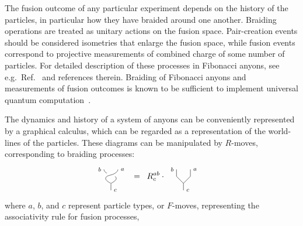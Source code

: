\documentclass[aps, prl, letterpaper, twocolumn, superscriptaddress, notitlepage, 10pt]{revtex4-1}
\begin{document}
The fusion outcome of any particular experiment depends on the history of the particles, in 
particular how they have braided around one another. Braiding operations are treated as 
unitary actions on the fusion space. Pair-creation events should be considered isometries 
that enlarge the fusion space, while fusion events correspond to projective measurements 
of combined charge of some number of particles. For detailed description of these 
processes in Fibonacci anyons, see e.g.~Ref.~\cite{Nayak2008} and references therein. 
Braiding of Fibonacci anyons and measurements of fusion outcomes is known to be 
sufficient to implement universal quantum computation~\cite{Freedman2002, Nayak2008}.

The dynamics and history of a system of anyons can be conveniently represented by a graphical calculus, which can be regarded as a representation of the world-lines of the particles. These diagrams can be manipulated by $R$-moves, corresponding to braiding processes:
	\begin{align}
	\label{e:rmove}
		\begin{tikzpicture}[baseline=0.5cm,scale=0.3]		
			\draw(0,0)--(0,1);
			\draw plot [smooth, tension=1] coordinates { (0,1) (0.75,1.8) (-0.6,2.45) (-1,3)};
			\draw[color=white, line width=7] plot [smooth, tension=1] coordinates { (0,1) (-0.75,1.8) (0.6,2.45) (1,3)};
			\draw plot [smooth, tension=1] coordinates { (0,1) (-0.75,1.8) (0.6,2.45) (1,3)};
			\node at (0,0) [anchor=west] {{\scriptsize $c$}};
			\node at (-1,3) [anchor=east] {{\scriptsize $b$}};
			\node at (1,3) [anchor=west] {{\scriptsize $a$}};
		\end{tikzpicture}
		&\;\;=\;\;R^{ab}_c\cdot\;
		\begin{tikzpicture}[baseline=0.5cm,scale=0.3]		
			\draw(0,0)--(0,1);
			\draw(0,1)--(-1,2)--(-1,3);
			\draw(0,1)--(1,2)--(1,3);
			\node at (0,0) [anchor=west] {{\scriptsize $c$}};
			\node at (-1,3) [anchor=east] {{\scriptsize $b$}};
			\node at (1,3) [anchor=west] {{\scriptsize $a$}};
		\end{tikzpicture}
	\end{align}
where $a$, $b$, and $c$ represent particle types, or $F$-moves, representing the associativity rule for fusion processes, 
\end{document}
